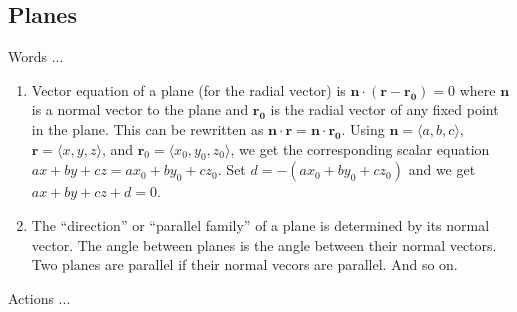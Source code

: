 \documentclass[10pt]{amsart}
\begin{document}
\subsection{Planes}

Words ...

\begin{enumerate}
\item Vector equation of a plane (for the radial vector) is
  $\mathbf{n} \cdot (\mathbf{r} - \mathbf{r_0}) = 0$ where
  $\mathbf{n}$ is a normal vector to the plane and $\mathbf{r_0}$ is
  the radial vector of any fixed point in the plane. This can be
  rewritten as $\mathbf{n} \cdot \mathbf{r} = \mathbf{n} \cdot
  \mathbf{r_0}$. Using $\mathbf{n} = \langle a,b,c \rangle$,
  $\mathbf{r} = \langle x,y,z \rangle$, and $\mathbf{r}_0 = \langle
  x_0,y_0,z_0 \rangle$, we get the corresponding scalar equation $ax +
  by + cz = ax_0 + by_0 + cz_0$. Set $d = -(ax_0 + by_0 + cz_0)$ and
  we get $ax + by + cz + d = 0$.
\item The ``direction'' or ``parallel family'' of a plane is
  determined by its normal vector. The angle between planes is the
  angle between their normal vectors. Two planes are parallel if their
  normal vecors are parallel. And so on.
\end{enumerate}

Actions ...
\end{document}
